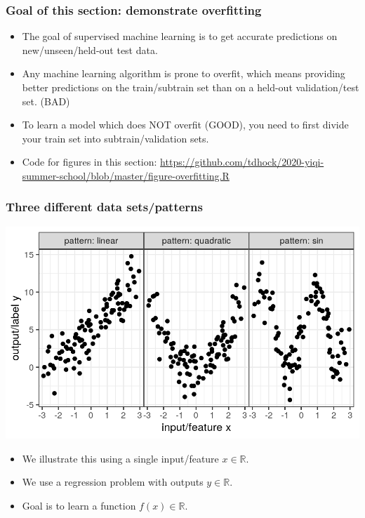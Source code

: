 \documentclass{beamer}
\begin{document}
\begin{frame}
  \frametitle{Goal of this section: demonstrate overfitting}
  \begin{itemize}
  \item The goal of supervised machine learning is to get accurate
    predictions on new/unseen/held-out test data.
  \item Any machine learning algorithm is prone to overfit, which
    means providing better predictions on the train/subtrain set than
    on a held-out validation/test set. (BAD)
  \item To learn a model which does NOT overfit (GOOD), you need to
    first divide your train set into subtrain/validation sets.
  \item Code for figures in this section:
    \url{https://github.com/tdhock/2020-yiqi-summer-school/blob/master/figure-overfitting.R}
  \end{itemize}
\end{frame}

\begin{frame}
  \frametitle{Three different data sets/patterns}
  \includegraphics[width=\textwidth]{figure-overfitting-data}

  \begin{itemize}
   \item We illustrate this using a single input/feature
    $x\in\mathbb R$.
  \item We use a regression problem with outputs $y\in\mathbb R$.
  \item Goal is to learn a function $f(x)\in\mathbb R$.
  \end{itemize}
\end{frame}
\end{document}
